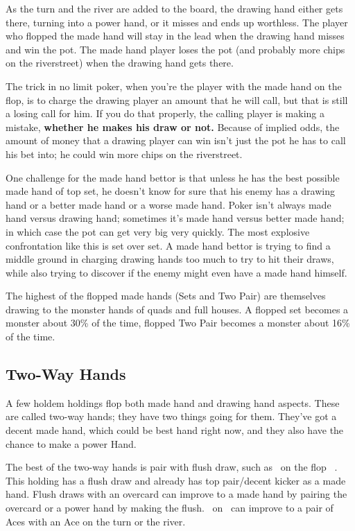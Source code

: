 
As the turn and the river are added to the board, the drawing hand
either gets there, turning into a power hand, or it misses and ends up
worthless. The player who flopped the made hand will stay in the lead
when the drawing hand misses and win the pot. The made hand player
loses the pot (and probably more chips on the riverstreet)
when the drawing hand gets there.

The trick in no limit poker, when you're the player with the made hand
on the flop, is to charge the drawing player an amount that he will
call, but that is still a losing call for him. If
you do that properly, the calling player is making a mistake,
\textbf{whether he makes his draw or not.} Because of implied odds,
the amount of money that a drawing player can win isn't just the pot
he has to call his bet into; he could win more chips on the
riverstreet.

One challenge for the made hand bettor is that unless he has the best
possible made hand of top set, he doesn't know for sure that his
enemy has a drawing hand or a better made hand or a worse made
hand. Poker isn't always made hand versus drawing hand; sometimes it's
made hand versus better made hand; in which case the pot can get very
big very quickly. The most explosive confrontation like this is set
over set. A made hand bettor is trying to find a middle ground in
charging drawing hands too much to try to hit their draws, while also
trying to discover if the enemy might even have a made hand himself.

The highest of the flopped made hands (Sets and Two Pair) are themselves
drawing to the monster hands of quads and full houses. A flopped set
becomes a monster about 30\% of the time, flopped Two Pair becomes a
monster about 16\% of the time.

\subsection{Two-Way Hands}

A few holdem holdings flop both made hand and drawing hand aspects.
These are called two-way hands; they have two things going for them.
They've got a decent made hand, which could be best hand right now,
and they also have the chance to make a power Hand.

The best of the two-way hands is pair with flush draw, such as
\Kd\tend\ on the flop \Kc\nined\eigd\ . This holding has a flush
draw and already has top pair/decent kicker as a made hand.
Flush draws with an overcard can improve to a made hand by
pairing the overcard or a power hand by making the flush. \Ad\sevd\ on
\Kc\nined\eigd\ can improve to a pair of Aces with an Ace on the turn
or the river.

